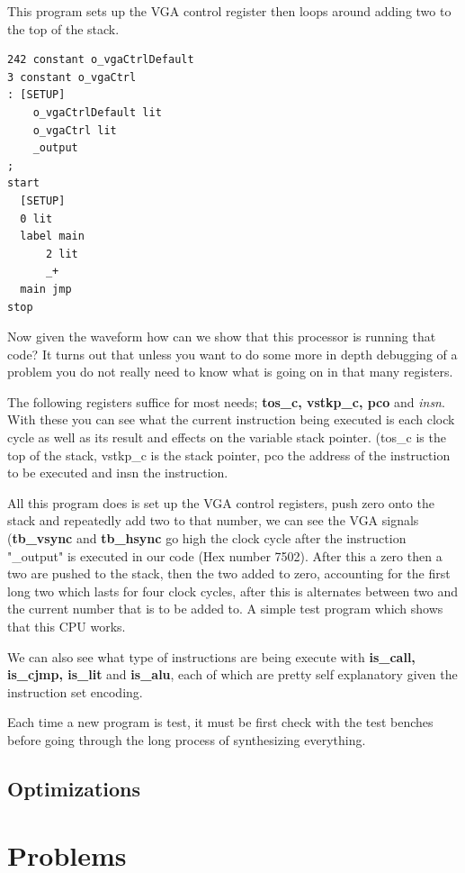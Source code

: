 \documentclass	[a4paper, 10pt]	{article}
\begin{document}
      This program sets up the VGA control register then loops around adding two to the top
      of the stack.

\begin{verbatim}
242 constant o_vgaCtrlDefault 
3 constant o_vgaCtrl
: [SETUP]
    o_vgaCtrlDefault lit
    o_vgaCtrl lit 
    _output
;
start
  [SETUP]
  0 lit
  label main
      2 lit
      _+
  main jmp
stop 
\end{verbatim}

    Now given the waveform how can we show that this processor is running that code? It turns
    out that unless you want to do some more in depth debugging of a problem you do not really
    need to know what is going on in that many registers.

    The following registers suffice for most needs; \textbf{tos\_c, vstkp\_c, pco} and \emph{insn}.
    With these you can see what the current instruction being executed is each clock cycle as
    well as its result and effects on the variable stack pointer. (tos\_c is the top of the stack,
    vstkp\_c is the stack pointer, pco the address of the instruction to be executed and insn the
    instruction. 

    All this program does is set up the VGA control registers, push zero onto the stack and
    repeatedly add two to that number, we can see the VGA signals (\textbf{tb\_vsync} and \textbf{tb\_hsync}
    go high the clock cycle after the instruction "\_output" is executed in our code (Hex number
    7502). After this a zero then a two are pushed to the stack, then the two added to zero,
    accounting for the first long two which lasts for four clock cycles, after this is alternates
    between two and the current number that is to be added to. A simple test program which
    shows that this CPU works.

    We can also see what type of instructions are being execute with \textbf{is\_call, is\_cjmp,
    is\_lit} and \textbf{is\_alu}, each of which are pretty self explanatory given the instruction
    set encoding.

    Each time a new program is test, it must be first check with the test benches before going
    through the long process of synthesizing everything.

    \subsection{Optimizations}

  \section{Problems}
\end{document}
